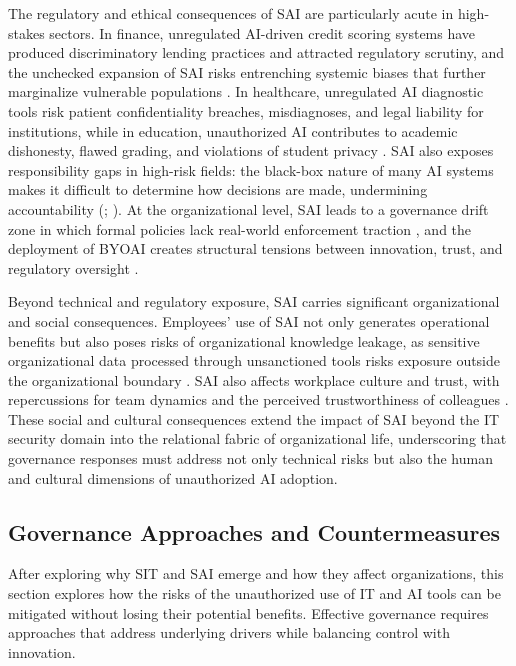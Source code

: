 \documentclass[12pt,oneside]{article}
\begin{document}
The regulatory and ethical consequences of \ac{SAI} are particularly acute in high-stakes sectors. In finance, unregulated \ac{AI}-driven credit scoring systems have produced discriminatory lending practices and attracted regulatory scrutiny, and the unchecked expansion of \ac{SAI} risks entrenching systemic biases that further marginalize vulnerable populations \citep[3]{balogun2025ethical}. In healthcare, unregulated \ac{AI} diagnostic tools risk patient confidentiality breaches, misdiagnoses, and legal liability for institutions, while in education, unauthorized \ac{AI} contributes to academic dishonesty, flawed grading, and violations of student privacy \citep[2]{balogun2025ethical}. \ac{SAI} also exposes responsibility gaps in high-risk fields: the black-box nature of many \ac{AI} systems makes it difficult to determine how decisions are made, undermining accountability (\citealp[1]{silic2025shadow}; \citealp[4]{balogun2025ethical}). At the organizational level, \ac{SAI} leads to a governance drift zone in which formal policies lack real-world enforcement traction \citep[1]{silic2025shadow}, and the deployment of \ac{BYOAI} creates structural tensions between innovation, trust, and regulatory oversight \citep[2693]{anthuvan2025byoai}.

Beyond technical and regulatory exposure, \ac{SAI} carries significant organizational and social consequences. Employees' use of \ac{SAI} not only generates operational benefits but also poses risks of organizational knowledge leakage, as sensitive organizational data processed through unsanctioned tools risks exposure outside the organizational boundary \citep[1]{chin2025conflicting}. \ac{SAI} also affects workplace culture and trust, with repercussions for team dynamics and the perceived trustworthiness of colleagues \citep[1]{varshini2025facing}. These social and cultural consequences extend the impact of \ac{SAI} beyond the \ac{IT} security domain into the relational fabric of organizational life, underscoring that governance responses must address not only technical risks but also the human and cultural dimensions of unauthorized \ac{AI} adoption.

\subsection{Governance Approaches and Countermeasures} \label{governance-approaches-and-countermeasures}

After exploring why \ac{SIT} and \ac{SAI} emerge and how they affect organizations, this section explores how the risks of the unauthorized use of \ac{IT} and \ac{AI} tools can be mitigated without losing their potential benefits. Effective governance requires approaches that address underlying drivers while balancing control with innovation.
\end{document}
